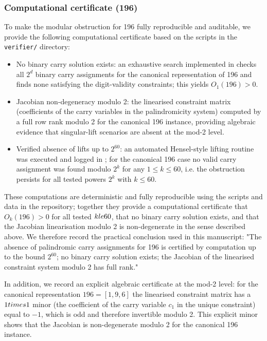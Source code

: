 \documentclass[12pt,a4paper]{article}
\begin{document}
\subsubsection*{Computational certificate (196)}
To make the modular obstruction for 196 fully reproducible and auditable, we provide the following computational certificate based on the scripts in the \texttt{verifier/} directory:
\begin{itemize}
\item No binary carry solution exists: an exhaustive search implemented in \texttt{} checks all $2^d$ binary carry assignments for the canonical representation of 196 and finds none satisfying the digit-validity constraints; this yields $O_1(196)>0$.
\item Jacobian non-degeneracy modulo 2: the linearised constraint matrix (coefficients of the carry variables in the palindromicity system) computed by \texttt{} a full row rank modulo 2 for the canonical 196 instance, providing algebraic evidence that singular-lift scenarios are absent at the mod-2 level.
\item Verified absence of lifts up to $2^{60}$: an automated Hensel-style lifting routine was executed and logged in \texttt{}; for the canonical 196 case no valid carry assignment was found modulo $2^k$ for any $1\le k\le 60$, i.e. the obstruction persists for all tested powers $2^k$ with $k\le 60$.
\end{itemize}

These computations are deterministic and fully reproducible using the scripts and data in the repository; together they provide a computational certificate that $O_k(196)>0$ for all tested $k\\le 60$, that no binary carry solution exists, and that the Jacobian linearisation modulo 2 is non-degenerate in the sense described above. We therefore record the practical conclusion used in this manuscript: "The absence of palindromic carry assignments for 196 is certified by computation up to the bound $2^{60}$; no binary carry solution exists; the Jacobian of the linearised constraint system modulo 2 has full rank."

In addition, we record an explicit algebraic certificate at the mod-2 level: for the canonical representation $196=[1,9,6]$ the linearised constraint matrix has a $1\\times1$ minor (the coefficient of the carry variable $c_1$ in the unique constraint) equal to $-1$, which is odd and therefore invertible modulo 2. This explicit minor shows that the Jacobian is non-degenerate modulo 2 for the canonical 196 instance.
\end{document}
